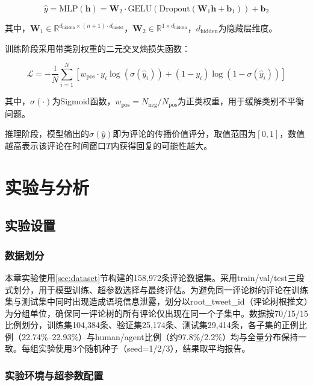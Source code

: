\begin{equation}
\hat{y} = \text{MLP}(\mathbf{h}) = \mathbf{W}_2 \cdot \text{GELU}(\text{Dropout}(\mathbf{W}_1 \mathbf{h} + \mathbf{b}_1)) + \mathbf{b}_2
\end{equation}

其中，$\mathbf{W}_1 \in \mathbb{R}^{d_{\text{hidden}} \times (n+1) \cdot d_{\text{model}}}$，$\mathbf{W}_2 \in \mathbb{R}^{1 \times d_{\text{hidden}}}$，$d_{\text{hidden}}$为隐藏层维度。

训练阶段采用带类别权重的二元交叉熵损失函数：

\begin{equation}
\mathcal{L} = -\frac{1}{N} \sum_{i=1}^{N} \left[ w_{\text{pos}} \cdot y_i \log(\sigma(\hat{y}_i)) + (1 - y_i) \log(1 - \sigma(\hat{y}_i)) \right]
\end{equation}

其中，$\sigma(\cdot)$为Sigmoid函数，$w_{\text{pos}} = N_{\text{neg}} / N_{\text{pos}}$为正类权重，用于缓解类别不平衡问题。

推理阶段，模型输出的$\sigma(\hat{y})$即为评论的传播价值评分，取值范围为$[0, 1]$，数值越高表示该评论在时间窗口$T$内获得回复的可能性越大。

\section{实验与分析}

\subsection{实验设置}

\subsubsection{数据划分}

本章实验使用\ref{sec:dataset}节构建的158,972条评论数据集。采用train/val/test三段式划分，用于模型训练、超参数选择与最终评估。为避免同一评论树的评论在训练集与测试集中同时出现造成语境信息泄露，划分以root\_tweet\_id（评论树根推文）为分组单位，确保同一评论树的所有评论仅出现在同一个子集中。数据按70/15/15比例划分，训练集104,384条、验证集25,174条、测试集29,414条，各子集的正例比例（22.74\%--22.93\%）与human/agent比例（约97.8\%/2.2\%）均与全量分布保持一致。每组实验使用3个随机种子（seed=1/2/3），结果取平均报告。

\subsubsection{实验环境与超参数配置}

